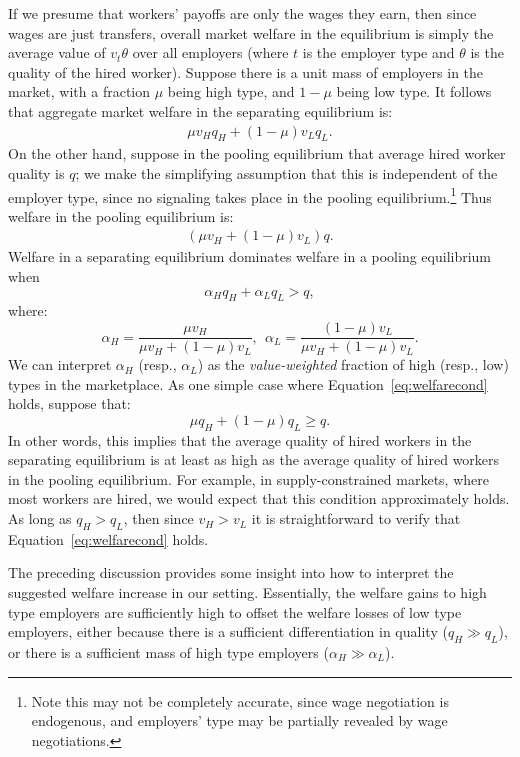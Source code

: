 If we presume that workers' payoffs are only the wages they earn, then since wages are just transfers, overall market welfare in the equilibrium is simply the average value of $v_t \theta$ over all employers (where $t$ is the employer type and $\theta$ is the quality of the hired worker).  
Suppose there is a unit mass of employers in the market, with a fraction $\mu$ being high type, and $1-\mu$ being low type.  
It follows that aggregate market welfare in the separating equilibrium is:
\begin{align}
\mu v_H q_H + (1 - \mu) v_L q_L. 
\end{align}
On the other hand, suppose in the pooling equilibrium that average hired worker quality is $q$; we make the simplifying assumption that this is independent of the employer type, since no signaling takes place in the pooling equilibrium.\footnote{Note this may not be completely accurate, since wage negotiation is endogenous, and employers' type may be partially revealed by wage negotiations.}    
Thus welfare in the pooling equilibrium is:
\begin{align}
  (\mu v_H + (1 - \mu) v_L) q.
\end{align}
Welfare in a separating equilibrium dominates welfare in a pooling equilibrium when 
\begin{equation}
\label{eq:welfarecond}
 \alpha_H q_H + \alpha_L q_L > q, 
\end{equation}
where:
\[ \alpha_H = \frac{\mu v_H}{\mu v_H + (1 - \mu) v_L},\ \ \alpha_L = \frac{(1 - \mu)v_L }{\mu v_H + (1 - \mu) v_L}. \]
We can interpret $\alpha_H$ (resp., $\alpha_L$) as the {\em value-weighted} fraction of high (resp., low) types in the marketplace.  
As one simple case where Equation~\ref{eq:welfarecond} holds, suppose that:
\[ \mu q_H + (1 - \mu) q_L \geq q. \]
In other words, this implies that the average quality of hired workers in the separating equilibrium is at least as high as the average quality of hired workers in the pooling equilibrium.  
For example, in supply-constrained markets, where most workers are hired, we would expect that this condition approximately holds.  
As long as $q_H > q_L$, then since $v_H > v_L$ it is straightforward to verify that Equation~\ref{eq:welfarecond} holds.

The preceding discussion provides some insight into how to interpret the suggested welfare increase in our setting.  
Essentially, the welfare gains to high type employers are sufficiently high to offset the welfare losses of low type employers, either because there is a sufficient differentiation in quality ($q_H \gg q_L$), or there is a sufficient mass of high type employers ($\alpha_H \gg \alpha_L$). 
